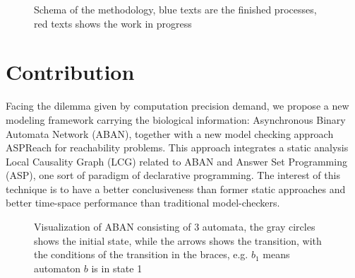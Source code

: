 \documentclass[final]{beamer}
\begin{document}
\begin{frame}[t]{}
\begin{columns}[t]
\begin{column}{.45\linewidth}
\begin{figure}
    \caption{Schema of the methodology, blue texts are the finished processes, red texts shows the work in progress}
\end{figure}

\section{Contribution}
Facing the dilemma given by computation precision demand, we propose a new modeling framework carrying the biological information: Asynchronous Binary Automata Network (ABAN), together with a new model checking approach ASPReach for reachability problems. 
This approach integrates a static analysis Local Causality Graph (LCG) \cite{pauleve2012} related to ABAN and Answer Set Programming (ASP), one sort of paradigm of declarative programming.
The interest of this technique is to have a better conclusiveness than former static approaches and better time-space performance than traditional model-checkers.

\begin{figure}
    \centering
    
    \caption{Visualization of ABAN consisting of 3 automata, the gray circles shows the initial state, while the arrows shows the transition, with the conditions of the transition in the braces, e.g. $b_1$ means automaton $b$ is in state 1}
    \label{fig:my_label}
\end{figure}


\end{column}
\end{columns}
\end{frame}
\end{document}
